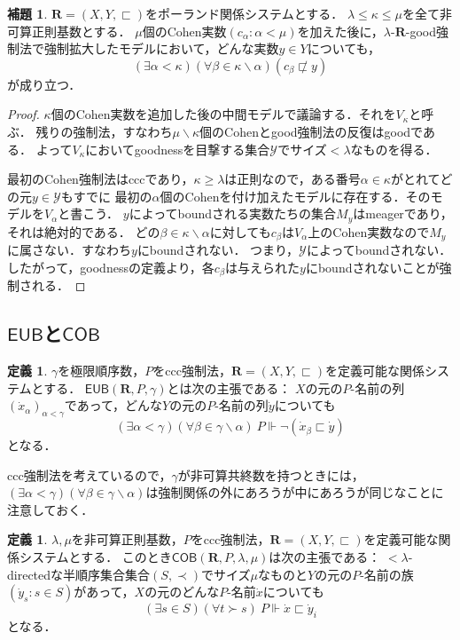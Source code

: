 \documentclass[uplatex,dvipdfmx]{jsarticle}
\newcommand\forces{\Vdash}
\newcommand{\EUB}{\mathsf{EUB}}
\newcommand{\COB}{\mathsf{COB}}
\newcommand{\relR}{\mathbf{R}}
\renewcommand{\setminus}{\smallsetminus}
\theoremstyle{definition}
\newtheorem{defi}[thm]{定義}
\newtheorem{lem}[thm]{補題}
\begin{document}
	\begin{lem}\label{lem:cohenreals}
		$\relR = (X, Y, \sqsubset)$をポーランド関係システムとする．
		$\lambda \le \kappa \le \mu$を全て非可算正則基数とする．
		$\mu$個のCohen実数$(c_\alpha : \alpha < \mu)$を加えた後に，$\lambda$-$\relR$-good強制法で強制拡大したモデルにおいて，どんな実数$y \in Y$についても，
		\[
		(\exists \alpha < \kappa)(\forall \beta \in \kappa \setminus \alpha)(c_\beta \not \sqsubset y)
		\]
		が成り立つ．
	\end{lem}
	\begin{proof}
		$\kappa$個のCohen実数を追加した後の中間モデルで議論する．それを$V_\kappa$と呼ぶ．
		残りの強制法，すなわち$\mu\setminus\kappa$個のCohenとgood強制法の反復はgoodである．
		よって$V_\kappa$においてgoodnessを目撃する集合$\mathcal{Y}$でサイズ${<}\lambda$なものを得る． 

		最初のCohen強制法はcccであり，$\kappa\ge \lambda$は正則なので，ある番号$\alpha\in\kappa$がとれてどの元$y \in \mathcal{Y}$もすでに
		最初の$\alpha$個のCohenを付け加えたモデルに存在する．そのモデルを$V_{\alpha}$と書こう．
		$y$によってboundされる実数たちの集合$M_y$はmeagerであり，それは絶対的である．
		どの$\beta\in\kappa\setminus \alpha$に対しても$c_\beta$は$V_{\alpha}$上のCohen実数なので$M_y$に属さない．すなわち$y$にboundされない．
		つまり，$\mathcal Y$によってboundされない．
		したがって，goodnessの定義より，各$c_\beta$は与えられた$y$にboundされないことが強制される．
	\end{proof}
	
	\subsection{$\EUB$と$\COB$}
	
	\begin{defi}
		$\gamma$を極限順序数，$P$をccc強制法，$\relR = (X, Y, \sqsubset)$を定義可能な関係システムとする．
		$\EUB(\relR, P, \gamma)$とは次の主張である：
		$X$の元の$P$-名前の列$(\dot{x}_\alpha)_{\alpha < \gamma}$であって，どんな$Y$の元の$P$-名前の列$\dot{y}$についても
		\[
		(\exists \alpha < \gamma)(\forall \beta \in \gamma \setminus \alpha)\ P \forces \neg (\dot{x}_\beta \sqsubset \dot{y})
		\]
		となる．
	\end{defi}
	ccc強制法を考えているので，$\gamma$が非可算共終数を持つときには，$(\exists \alpha < \gamma)(\forall \beta \in \gamma \setminus \alpha)$は強制関係の外にあろうが中にあろうが同じなことに注意しておく．
	
	\begin{defi}
		$\lambda, \mu$を非可算正則基数，$P$をccc強制法，$\relR = (X, Y, \sqsubset)$を定義可能な関係システムとする．
		このとき$\COB(\relR, P, \lambda, \mu)$は次の主張である：
		${<}\lambda$-directedな半順序集合集合$(S, \prec)$でサイズ$\mu$なものと$Y$の元の$P$-名前の族$(\dot{y}_s : s \in S)$があって，$X$の元のどんな$P$-名前$\dot{x}$についても
		\[
		(\exists s \in S)(\forall t \succ s) \ P \forces \dot{x} \sqsubset \dot{y}_i
		\]
		となる．
	\end{defi}
\end{document}
